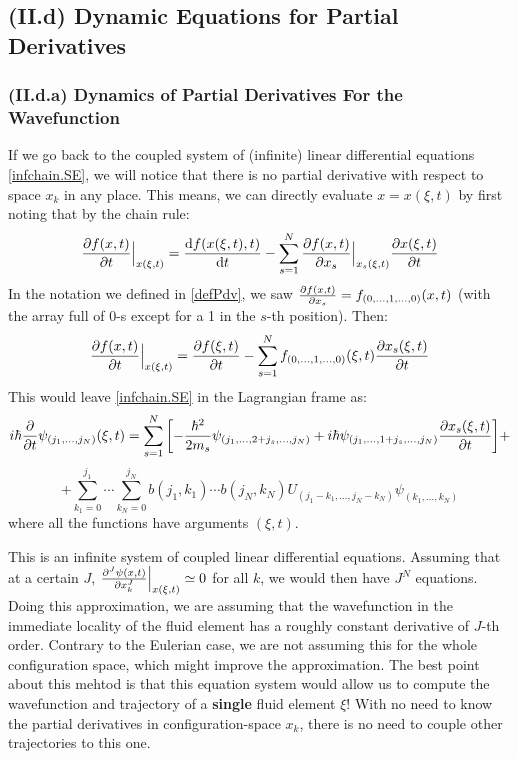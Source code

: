 \documentclass[11pt, a4paper]{article} %
\begin{document}
\subsection*{(II.d) Dynamic Equations for Partial Derivatives}


\subsubsection*{(II.d.a) Dynamics of Partial Derivatives For the Wavefunction}

If we go back to the coupled system of (infinite) linear differential equations \eqref{infchain.SE}, we will notice that there is no partial derivative with respect to space $x_k$ in any place. This means, we can directly evaluate $x=x(\xi,t)$ by first noting that by the chain rule:
\begin{equation}
\pdv{f(x,t)}{t}\Big\rvert_{x(\xi,t)} = \dv{f(x(\xi,t),t)}{t}-\sum_{s=1}^N \pdv{f(x,t)}{x_s}\Big\rvert_{x_s(\xi,t)}\pdv{x(\xi,t)}{t}
\end{equation}
In the notation we defined in \eqref{defPdv}, we saw $\pdv{f(x,t)}{x_s}=f_{(0,...,1,...,0)}(x,t)$ (with the array full of 0-s except for a 1 in the $s$-th position). Then:
\begin{equation}\label{matrialTimePdv}
\pdv{f(x,t)}{t}\Big\rvert_{x(\xi,t)} = \pdv{f(\xi,t)}{t}-\sum_{s=1}^N f_{(0,...,1,...,0)}(\xi,t) \pdv{x_s(\xi,t)}{t}
\end{equation}
This would leave \eqref{infchain.SE} in the Lagrangian frame as:
\begin{equation}\label{infchain.SE}
i\hbar \pdv{}{t}\psi_{(j_1,...,j_N)}(\xi,t)=\sum_{s=1}^N\qty[-\frac{\hbar^2}{2m_s}\psi_{(j_1,...,2+j_s,...,j_N)}+i\hbar \psi_{(j_1,...,1+j_s,...,j_N)} \pdv{x_s(\xi,t)}{t}]+
\end{equation}
$$
+\sum_{k_1=0}^{j_1}\cdots\sum_{k_N=0}^{j_N} b(j_1,k_1)\cdots b(j_N,k_N)U_{(j_1-k_1,...,j_N-k_N)}\psi_{(k_1,...,k_N)}
$$
where all the functions have arguments $(\xi,t)$.

This is an infinite system of coupled linear differential equations. Assuming that at a certain $J$, $\pdv[J]{\psi(x,t)}{x_k}\Big\rvert_{x(\xi,t)}\simeq 0$ for all $k$, we would then have $J^N$ equations. Doing this approximation, we are assuming that the wavefunction in the immediate locality of the fluid element has a roughly constant derivative of $J$-th order. Contrary to the Eulerian case, we are not assuming this for the whole configuration space, which might improve the approximation. The best point about this mehtod is that this equation system would allow us to compute the wavefunction and trajectory of a {\bf single} fluid element $\xi$! With no need to know the partial derivatives in configuration-space $x_k$, there is no need to couple other trajectories to this one.
\end{document}
